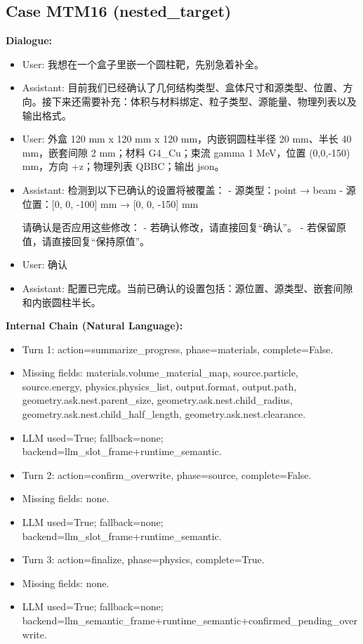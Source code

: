 \documentclass[11pt]{ctexart}
\begin{document}
\subsection{Case MTM16 (nested\_target)}
\textbf{Dialogue:}
\begin{itemize}
\item User: 我想在一个盒子里嵌一个圆柱靶，先别急着补全。
\item Assistant: 目前我们已经确认了几何结构类型、盒体尺寸和源类型、位置、方向。接下来还需要补充：体积与材料绑定、粒子类型、源能量、物理列表以及输出格式。
\item User: 外盒 120 mm x 120 mm x 120 mm，内嵌铜圆柱半径 20 mm、半长 40 mm，嵌套间隙 2 mm；材料 G4\_Cu；束流 gamma 1 MeV，位置 (0,0,-150) mm，方向 +z；物理列表 QBBC；输出 json。
\item Assistant: 检测到以下已确认的设置将被覆盖：
- 源类型：point → beam
- 源位置：[0, 0, -100] mm → [0, 0, -150] mm

请确认是否应用这些修改：
- 若确认修改，请直接回复“确认”。
- 若保留原值，请直接回复“保持原值”。
\item User: 确认
\item Assistant: 配置已完成。当前已确认的设置包括：源位置、源类型、嵌套间隙和内嵌圆柱半长。
\end{itemize}
\textbf{Internal Chain (Natural Language):}
\begin{itemize}
\item Turn 1: action=summarize\_progress, phase=materials, complete=False.
\item Missing fields: materials.volume\_material\_map, source.particle, source.energy, physics.physics\_list, output.format, output.path, geometry.ask.nest.parent\_size, geometry.ask.nest.child\_radius, geometry.ask.nest.child\_half\_length, geometry.ask.nest.clearance.
\item LLM used=True; fallback=none; backend=llm\_slot\_frame+runtime\_semantic.
\item Turn 2: action=confirm\_overwrite, phase=source, complete=False.
\item Missing fields: none.
\item LLM used=True; fallback=none; backend=llm\_slot\_frame+runtime\_semantic.
\item Turn 3: action=finalize, phase=physics, complete=True.
\item Missing fields: none.
\item LLM used=True; fallback=none; backend=llm\_semantic\_frame+runtime\_semantic+confirmed\_pending\_overwrite.
\end{itemize}
\end{document}
